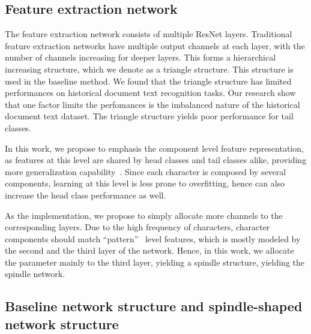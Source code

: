 \subsection{Feature extraction network}

The feature extraction network consists of multiple ResNet layers. Traditional feature extraction networks have multiple output channels at each layer, with the number of channels increasing for deeper layers. This forms a hierarchical increasing structure, which we denote as a triangle structure. This structure is used in the baseline method. We found that the triangle structure has limited performances on historical document text recognition tasks. Our research show that one factor limits the perfomances is the imbalanced nature of the historical document text dataset.
The triangle structure yields poor performance for tail classes. 

In this work, we propose to emphasis the component level feature representation, as features at this level are shared by head classes and tail classes alike, providing more generalization capability~\cite{sanicdar23,fudanvi}.
Since each character is composed by several components, learning at this level is less prone to overfitting, hence can also increase the head class performance as well.

As the implementation, we propose to simply allocate more channels to the corresponding layers. Due to the high frequency of characters, character components should match ``pattern''~\cite{dissection} level features, which is mostly modeled by the second and the third layer of the network.
Hence, in this work, we allocate the parameter mainly to the third layer, yielding a spindle structure, yielding the spindle network.






\subsection{Baseline network structure and spindle-shaped network structure}


